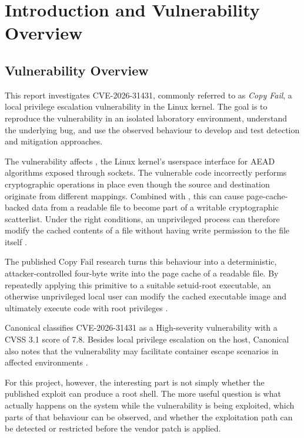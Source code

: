 \section{Introduction and Vulnerability Overview}
\label{sec:introduction}

\subsection{Vulnerability Overview}

This report investigates CVE-2026-31431, commonly referred to as
\emph{Copy Fail}, a local privilege escalation vulnerability in the Linux
kernel. The goal is to reproduce the vulnerability in an isolated laboratory
environment, understand the underlying bug, and use the observed behaviour to
develop and test detection and mitigation approaches.

The vulnerability affects , the Linux kernel's userspace
interface for AEAD algorithms exposed through  sockets. The
vulnerable code incorrectly performs cryptographic operations in place even
though the source and destination originate from different mappings. Combined
with , this can cause page-cache-backed data from a readable file
to become part of a writable cryptographic scatterlist. Under the right
conditions, an unprivileged process can therefore modify the cached contents
of a file without having write permission to the file itself
\cite{ubuntu-copyfail-cve,linux-copyfail-fix}.

The published Copy Fail research turns this behaviour into a deterministic,
attacker-controlled four-byte write into the page cache of a readable file.
By repeatedly applying this primitive to a suitable setuid-root executable,
an otherwise unprivileged local user can modify the cached executable image
and ultimately execute code with root privileges
\cite{copyfail-research}.

Canonical classifies CVE-2026-31431 as a High-severity vulnerability with a
CVSS 3.1 score of 7.8. Besides local privilege escalation on the host,
Canonical also notes that the vulnerability may facilitate container escape
scenarios in affected environments
\cite{ubuntu-copyfail-cve}.

For this project, however, the interesting part is not simply whether the
published exploit can produce a root shell. The more useful question is what
actually happens on the system while the vulnerability is being exploited,
which parts of that behaviour can be observed, and whether the exploitation
path can be detected or restricted before the vendor patch is applied.

